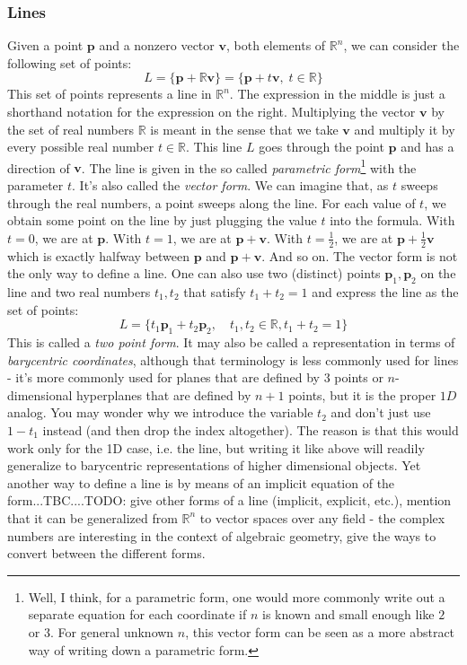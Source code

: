 \subsubsection{Lines}
Given a point $\mathbf{p}$ and a nonzero vector $\mathbf{v}$, both elements of $\mathbb{R}^n$, we can consider the following set of points:
\begin{equation}
 L 
 =
 \{\mathbf{p} + \mathbb{R} \mathbf{v} \} 
 = 
 \{ \mathbf{p} + t \mathbf{v}, \; t \in \mathbb{R} \}
\end{equation}
This set of points represents a line in $\mathbb{R}^n$. The expression in the middle is just a shorthand notation for the expression on the right. Multiplying the vector $\mathbf{v}$ by the set of real numbers $\mathbb{R}$ is meant in the sense that we take $\mathbf{v}$ and multiply it by every possible real number $t \in \mathbb{R}$. This line $L$ goes through the point $\mathbf{p}$ and has a direction of $\mathbf{v}$. The line is given in the so called \emph{parametric form}\footnote{Well, I think, for a parametric form, one would more commonly write out a separate equation for each coordinate if $n$ is known and small enough like $2$ or $3$. For general unknown $n$, this vector form can be seen as a more abstract way of writing down a parametric form.} with the parameter $t$. It's also called the \emph{vector form}. We can imagine that, as $t$ sweeps through the real numbers, a point sweeps along the line. For each value of $t$, we obtain some point on the line by just plugging the value $t$ into the formula. With $t=0$, we are at $\mathbf{p}$. With $t=1$, we are at $\mathbf{p + v}$. With $t=\frac{1}{2}$, we are at $\mathbf{p} + \frac{1}{2} \mathbf{v}$ which is exactly halfway between $\mathbf{p}$ and $\mathbf{p + v}$. And so on. The vector form is not the only way to define a line. One can also use two (distinct) points $\mathbf{p}_1,\mathbf{p}_2$ on the line and two real numbers $t_1, t_2$ that satisfy $t_1 + t_2 = 1$ and express the line as the set of points:
\begin{equation}
 L = \{ t_1 \mathbf{p}_1 + t_2 \mathbf{p}_2,  \quad t_1, t_2 \in \mathbb{R}, t_1 + t_2 = 1 \}
\end{equation}
This is called a \emph{two point form}. It may also be called a representation in terms of \emph{barycentric coordinates}, although that terminology is less commonly used for lines - it's more commonly used for planes that are defined by 3 points or $n$-dimensional hyperplanes that are defined by $n+1$ points, but it is the proper $1D$ analog. You may wonder why we introduce the variable $t_2$ and don't just use $1 - t_1$ instead (and then drop the index altogether). The reason is that this would work only for the 1D case, i.e. the line, but writing it like above will readily generalize to barycentric representations of higher dimensional objects. Yet another way to define a line is by means of an implicit equation of the form...TBC....TODO: give other forms of a line (implicit, explicit, etc.), mention that it can be generalized from $\mathbb{R}^n$ to vector spaces over any field - the complex numbers are interesting in the context of algebraic geometry, give the ways to convert between the different forms.

